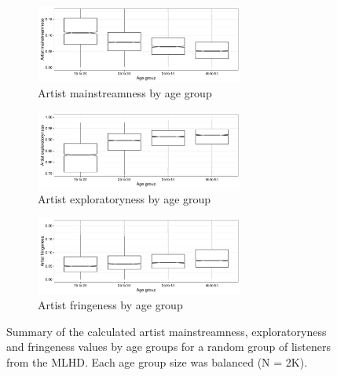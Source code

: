 \begin{figure}[!h]
	\centering
	\begin{subfigure}[h]{\textwidth}
		\centering
		\includegraphics[width=0.75\textwidth]{artist_mainstreamness_by_age_groups_boxplot.pdf}
        \caption{Artist mainstreamness by age group}
        \label{fig:artist_mainstreamness_by_age_groups_boxplot}
	\end{subfigure}

	\begin{subfigure}[h]{\textwidth}
		\centering
		\includegraphics[width=0.75\textwidth]{artist_exploratoryness_by_age_groups_boxplot.pdf}
        \caption{Artist exploratoryness by age group}
 		\label{fig:artist_exploratoryness_by_age_groups_boxplot}
	\end{subfigure}

	\begin{subfigure}[h]{\textwidth}
		\centering
		\includegraphics[width=0.75\textwidth]{artist_fringeness_by_age_groups_boxplot.pdf}
        \caption{Artist fringeness by age group}
        \label{fig:artist_fringeness_by_age_groups_boxplot}
	\end{subfigure}

\caption[Summary of artist mainstreamness, exploratoryness and fringeness by age groups]{Summary of the calculated artist mainstreamness, exploratoryness and fringeness values by age groups for a random group of listeners from the MLHD. Each age group size was balanced (N = 2K).}
\label{fig:artist_profiling_features_age_groups}
\end{figure}




